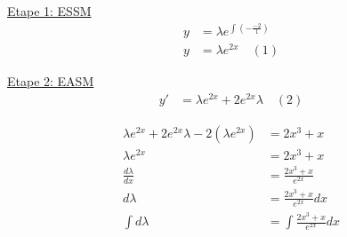 \underline{Etape 1: ESSM}
\begin{align*}
	y &= \lambda e^{\int(-\frac{-2}{1})} \\
	y &= \lambda e^{2x} \quad (1)
\end{align*}

\underline{Etape 2: EASM} \\
\begin{align*}
	y' &= \lambda e^{2x} + 2e^{2x}\lambda \quad (2)
\end{align*}

\begin{align*}
	\lambda e^{2x} + 2e^{2x}\lambda - 2(\lambda e^{2x}) &= 2x^3 + x \\
	\lambda e^{2x} &= 2x^3 + x \\
	\frac{d\lambda}{dx} &= \frac{2x^3 + x}{e^{2x}} \\
	d\lambda &= \frac{2x^3 + x}{e^{2x}} dx \\
	\int d\lambda &= \int \frac{2x^3 +x}{e^{2x}} dx \\
\end{align*}